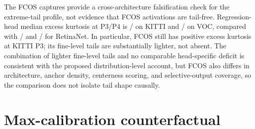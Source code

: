 \documentclass[10pt]{article}
\begin{document}
The FCOS captures provide a cross-architecture falsification check for the
extreme-tail profile, not evidence that FCOS activations are tail-free.
Regression-head median excess kurtosis at P3/P4 is
\nnActRegKurtPThreeFcosKitti{}/\nnActRegKurtPFourFcosKitti{} on KITTI and
\nnActRegKurtPThreeFcosVoc{}/\nnActRegKurtPFourFcosVoc{} on VOC, compared
with \nnActRegKurtPThreeKitti{}/\nnActRegKurtPFourKitti{} and
\nnActRegKurtPThreeVoc{}/\nnActRegKurtPFourVoc{} for RetinaNet. In
particular, FCOS still has positive excess kurtosis at KITTI P3; its fine-level
tails are substantially lighter, not absent. The combination of lighter
fine-level tails and no comparable head-specific deficit is consistent
with the proposed distribution-level account, but FCOS also differs in
architecture, anchor density, centerness scoring, and selective-output
coverage, so the comparison does not isolate tail shape causally.

\begin{table}[htbp]
\centering\scriptsize
\caption{Per-region activation statistics over the 512-image clean
calibration sets for trained RetinaNet and FCOS graphs and the pretrained
COCO RetinaNet graph. $|x|_{\max}$ is the per-channel absolute maximum;
excess kurtosis is Fisher. For each tensor, channel-level statistics are
summarized by a median; table medians are then taken across tensors.
``Shared head inputs'' are tensors consumed by both heads (FPN boundary
features).}
\label{tab:nn-actstats}
{\setlength{\tabcolsep}{3pt}}
\end{table}

\begin{table}[htbp]
\centering\scriptsize
\caption{Per-FPN-level activation statistics, reported as the median of
per-tensor median-channel $|x|_{\max}$~$/$~excess kurtosis at each level (P3
finest, P7 coarsest; shared FPN boundary tensors are excluded from
these head-specific summaries). The table includes three RetinaNet and two FCOS graphs;
fine-level tails are substantially heavier in RetinaNet.}
\label{tab:nn-actstats-level}
{\setlength{\tabcolsep}{3pt}}
\end{table}

\section{Max-calibration counterfactual}
\label{sec:maxcalib}
\end{document}
